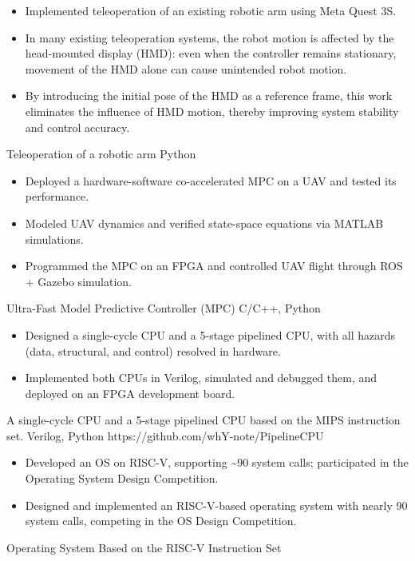 \documentclass[]{awesome-cv}
\begin{document}
\begin{cventries}
	\cventry
	{\begin{itemize}[leftmargin=*]
		\item Implemented teleoperation of an existing robotic arm using Meta Quest 3S.
		\item In many existing teleoperation systems, the robot motion is affected by the head-mounted display (HMD): even when the controller remains stationary, movement of the HMD alone can cause unintended robot motion. 
		\item By introducing the initial pose of the HMD as a reference frame, this work eliminates the influence of HMD motion, thereby improving system stability and control accuracy.
	\end{itemize}
	}
	{Teleoperation of a robotic arm}
	{Python}
	{}
	{}
	
	\vspace{-5mm}
	\cventry
	{\begin{itemize}[leftmargin=*]
		\item Deployed a hardware-software co-accelerated MPC on a UAV and tested its performance. 
		\item Modeled UAV dynamics and verified state-space equations via MATLAB simulations. 
		\item Programmed the MPC on an FPGA and controlled UAV flight through ROS + Gazebo simulation.
	\end{itemize}
	}
	{Ultra-Fast Model Predictive Controller (MPC)}
	{C/C++, Python}
	{}
	{}
	
	\vspace{-5mm}
	\cventry
	{\begin{itemize}[leftmargin=*]
		\item Designed a single-cycle CPU and a 5-stage pipelined CPU, with all hazards (data, structural, and control) resolved in hardware. 
		\item Implemented both CPUs in Verilog, simulated and debugged them, and deployed on an FPGA development board.
	\end{itemize}
	}
	{A single-cycle CPU and a 5-stage pipelined CPU based on the MIPS instruction set.}
	{Verilog, Python}
	{https://github.com/whY-note/PipelineCPU}
	{}
	
	\vspace{-5mm}
	\cventry
	{
	\begin{itemize}[leftmargin=*]
		\item Developed an OS on RISC-V, supporting \textasciitilde{}90 system calls; participated in the Operating System Design Competition.
		\item Designed and implemented an RISC-V-based operating system with nearly 90 system calls, competing in the OS Design Competition.
	\end{itemize}
	}
	{Operating System Based on the RISC-V Instruction Set}
	{}
	{}
	{}
	
	\vspace{-5mm}
\end{cventries}
\end{document}
